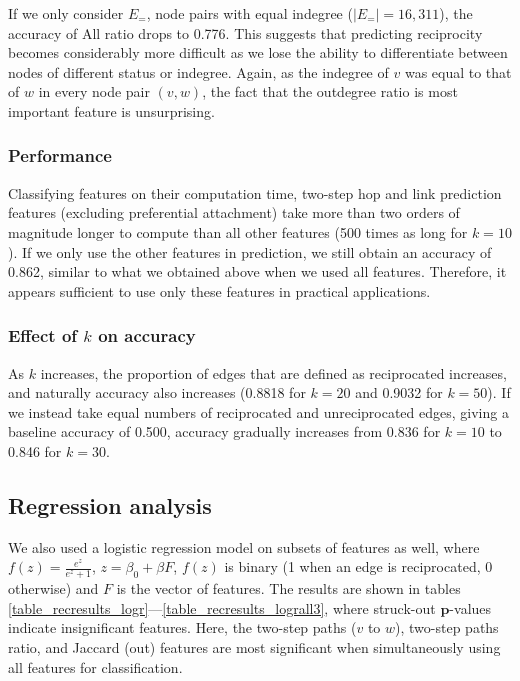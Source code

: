 \documentclass[conference]{IEEEtran}
\begin{document}
If we only consider $E_=$, node pairs with equal indegree ($|E_=|=16,311$), the accuracy of All ratio drops to 0.776.
This suggests that predicting reciprocity becomes considerably more difficult as we lose the ability to differentiate between nodes of different status or indegree. 
Again, as the indegree of $v$ was equal to that of $w$ in every node pair $(v,w)$, the fact that the outdegree ratio is most important feature is unsurprising.

\subsubsection{Performance}
Classifying features on their computation time, two-step hop and link prediction features (excluding preferential attachment) take more than two orders of magnitude longer to compute than all other features (500 times as long for $k=10$).
If we only use the other features in prediction, we still obtain an accuracy of 0.862, similar to what we obtained above when we used all features.
Therefore, it appears sufficient to use only these features in practical applications.

\subsubsection{Effect of $k$ on accuracy}
As $k$ increases, the proportion of edges that are defined as reciprocated increases, and naturally accuracy also increases (0.8818 for $k=20$ and 0.9032 for $k=50$).
If we instead take equal numbers of reciprocated and unreciprocated edges, giving a baseline accuracy of 0.500, accuracy gradually increases from 0.836 for $k=10$ to 0.846 for $k=30$.

\subsection{Regression analysis}
We also used a logistic regression model on subsets of features as well, where $f(z) = \frac{e^z}{e^z+1}$, $z = \beta_0 + \beta F$, $f(z)$ is binary (1 when an edge is reciprocated, 0 otherwise) and $F$ is the vector of features.
The results are shown in tables \ref{table_recresults_logr}---\ref{table_recresults_lograll3}, where struck-out $\mathbf{p}$-values indicate insignificant features. 
Here, the two-step paths ($v$ to $w$), two-step paths ratio, and Jaccard (out) features are most significant when simultaneously using all features for classification. 
\end{document}
